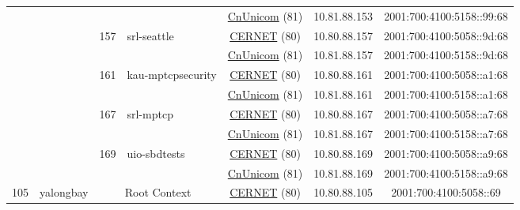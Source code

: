 \begin{small}
\begin{center}
\begin{longtable}{|c|c|c|c|c|c|c|c|}
  &  &  &  & \multicolumn{2}{|c|}{\tiny{\href{http://www.chinaunicom.com}{CnUnicom} (81)}} & \tiny{10.81.88.153} & \tiny{2001:700:4100:5158::99:68} \\* \cline{3-3}\cline{4-4}\cline{5-5}\cline{6-6}\cline{7-7}\cline{8-8}
  &  & \multirow{2}{*}{\tiny{157}} & \multicolumn{1}{|l|}{\multirow{2}{*}{\tiny{srl-seattle}}} & \multicolumn{2}{|c|}{\tiny{\href{http://www.cernet.edu.cn}{CERNET} (80)}} & \tiny{10.80.88.157} & \tiny{2001:700:4100:5058::9d:68} \\* \cline{5-5}\cline{6-6}\cline{7-7}\cline{8-8}
  &  &  &  & \multicolumn{2}{|c|}{\tiny{\href{http://www.chinaunicom.com}{CnUnicom} (81)}} & \tiny{10.81.88.157} & \tiny{2001:700:4100:5158::9d:68} \\* \cline{3-3}\cline{4-4}\cline{5-5}\cline{6-6}\cline{7-7}\cline{8-8}
  &  & \multirow{2}{*}{\tiny{161}} & \multicolumn{1}{|l|}{\multirow{2}{*}{\tiny{kau-mptcpsecurity}}} & \multicolumn{2}{|c|}{\tiny{\href{http://www.cernet.edu.cn}{CERNET} (80)}} & \tiny{10.80.88.161} & \tiny{2001:700:4100:5058::a1:68} \\* \cline{5-5}\cline{6-6}\cline{7-7}\cline{8-8}
  &  &  &  & \multicolumn{2}{|c|}{\tiny{\href{http://www.chinaunicom.com}{CnUnicom} (81)}} & \tiny{10.81.88.161} & \tiny{2001:700:4100:5158::a1:68} \\* \cline{3-3}\cline{4-4}\cline{5-5}\cline{6-6}\cline{7-7}\cline{8-8}
  &  & \multirow{2}{*}{\tiny{167}} & \multicolumn{1}{|l|}{\multirow{2}{*}{\tiny{srl-mptcp}}} & \multicolumn{2}{|c|}{\tiny{\href{http://www.cernet.edu.cn}{CERNET} (80)}} & \tiny{10.80.88.167} & \tiny{2001:700:4100:5058::a7:68} \\* \cline{5-5}\cline{6-6}\cline{7-7}\cline{8-8}
  &  &  &  & \multicolumn{2}{|c|}{\tiny{\href{http://www.chinaunicom.com}{CnUnicom} (81)}} & \tiny{10.81.88.167} & \tiny{2001:700:4100:5158::a7:68} \\* \cline{3-3}\cline{4-4}\cline{5-5}\cline{6-6}\cline{7-7}\cline{8-8}
  &  & \multirow{2}{*}{\tiny{169}} & \multicolumn{1}{|l|}{\multirow{2}{*}{\tiny{uio-sbdtests}}} & \multicolumn{2}{|c|}{\tiny{\href{http://www.cernet.edu.cn}{CERNET} (80)}} & \tiny{10.80.88.169} & \tiny{2001:700:4100:5058::a9:68} \\* \cline{5-5}\cline{6-6}\cline{7-7}\cline{8-8}
  &  &  &  & \multicolumn{2}{|c|}{\tiny{\href{http://www.chinaunicom.com}{CnUnicom} (81)}} & \tiny{10.81.88.169} & \tiny{2001:700:4100:5158::a9:68} \\ \hline
 \multirow{20}{*}{\tiny{105}} & \multicolumn{1}{|l|}{\multirow{20}{*}{\tiny{yalongbay}}} & \multicolumn{2}{|c|}{\multirow{2}{*}{\tiny{Root Context}}} & \multicolumn{2}{|c|}{\tiny{\href{http://www.cernet.edu.cn}{CERNET} (80)}} & \tiny{10.80.88.105} & \tiny{2001:700:4100:5058::69} \\* \cline{5-5}\cline{6-6}\cline{7-7}\cline{8-8}

\end{longtable}
\end{center}
\end{small}
